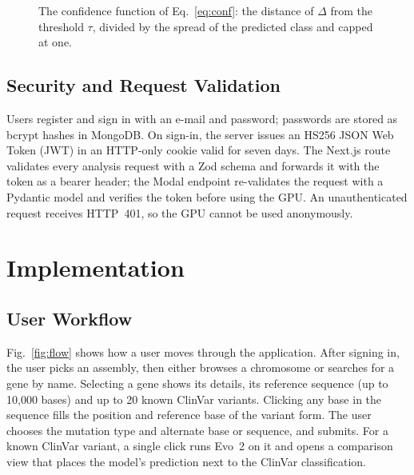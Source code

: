 \documentclass[conference,a4paper]{IEEEtran}
\def\confTau{-0.0009178519}
\def\confSigLOF{0.0015140239}
\def\confSigFUNC{0.0009016589}
\begin{document}
\begin{figure}[!t]
\centering
{}
\caption{The confidence function of Eq.~\eqref{eq:conf}: the distance of $\Delta$ from the threshold $\tau$, divided by the spread of the predicted class and capped at one.}
\label{fig:conf}
\end{figure}

\subsection{Security and Request Validation}
Users register and sign in with an e-mail and password; passwords are stored as bcrypt hashes in MongoDB. On sign-in, the server issues an HS256 JSON Web Token (JWT) in an HTTP-only cookie valid for seven days. The Next.js route validates every analysis request with a Zod schema and forwards it with the token as a bearer header; the Modal endpoint re-validates the request with a Pydantic model and verifies the token before using the GPU. An unauthenticated request receives HTTP~401, so the GPU cannot be used anonymously.

\section{Implementation}
\label{sec:impl}

\subsection{User Workflow}
Fig.~\ref{fig:flow} shows how a user moves through the application. After signing in, the user picks an assembly, then either browses a chromosome or searches for a gene by name. Selecting a gene shows its details, its reference sequence (up to 10{,}000 bases) and up to 20 known ClinVar variants. Clicking any base in the sequence fills the position and reference base of the variant form. The user chooses the mutation type and alternate base or sequence, and submits. For a known ClinVar variant, a single click runs Evo~2 on it and opens a comparison view that places the model's prediction next to the ClinVar classification.
\end{document}
